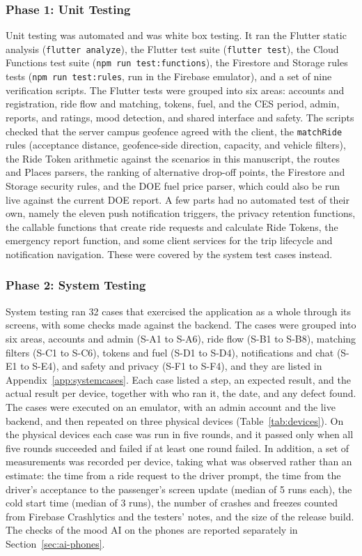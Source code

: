\subsubsection{Phase 1: Unit Testing}
Unit testing was automated and was white box testing. It ran the Flutter static analysis (\texttt{flutter analyze}), the Flutter test suite (\texttt{flutter test}), the Cloud Functions test suite (\texttt{npm run test:functions}), the Firestore and Storage rules tests (\texttt{npm run test:rules}, run in the Firebase emulator), and a set of nine verification scripts. The Flutter tests were grouped into six areas: accounts and registration, ride flow and matching, tokens, fuel, and the CES period, admin, reports, and ratings, mood detection, and shared interface and safety. The scripts checked that the server campus geofence agreed with the client, the \texttt{matchRide} rules (acceptance distance, geofence-side direction, capacity, and vehicle filters), the Ride Token arithmetic against the scenarios in this manuscript, the routes and Places parsers, the ranking of alternative drop-off points, the Firestore and Storage security rules, and the DOE fuel price parser, which could also be run live against the current DOE report. A few parts had no automated test of their own, namely the eleven push notification triggers, the privacy retention functions, the callable functions that create ride requests and calculate Ride Tokens, the emergency report function, and some client services for the trip lifecycle and notification navigation. These were covered by the system test cases instead.

\subsubsection{Phase 2: System Testing}
System testing ran 32 cases that exercised the application as a whole through its screens, with some checks made against the backend. The cases were grouped into six areas, accounts and admin (S-A1 to S-A6), ride flow (S-B1 to S-B8), matching filters (S-C1 to S-C6), tokens and fuel (S-D1 to S-D4), notifications and chat (S-E1 to S-E4), and safety and privacy (S-F1 to S-F4), and they are listed in Appendix~\ref{app:systemcases}. Each case listed a step, an expected result, and the actual result per device, together with who ran it, the date, and any defect found. The cases were executed on an emulator, with an admin account and the live backend, and then repeated on three physical devices (Table~\ref{tab:devices}). On the physical devices each case was run in five rounds, and it passed only when all five rounds succeeded and failed if at least one round failed. In addition, a set of measurements was recorded per device, taking what was observed rather than an estimate: the time from a ride request to the driver prompt, the time from the driver's acceptance to the passenger's screen update (median of 5 runs each), the cold start time (median of 3 runs), the number of crashes and freezes counted from Firebase Crashlytics and the testers' notes, and the size of the release build. The checks of the mood AI on the phones are reported separately in Section~\ref{sec:ai-phones}.

